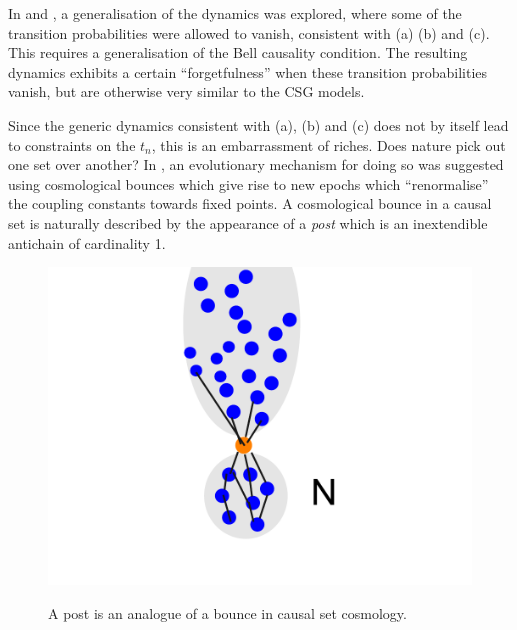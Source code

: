In \cite{rv} and \cite{observablesds},
a generalisation of the dynamics was explored,  where some of the transition probabilities were allowed to vanish, consistent with
(a) (b) and (c). This requires  a  generalisation of the Bell causality condition. The resulting dynamics exhibits a
certain ``forgetfulness'' when these transition probabilities vanish, but are otherwise very similar to the CSG
models.

Since the generic dynamics  consistent with  (a), (b) and (c) does not by itself lead to constraints on the 
 $t_n$,  this is an embarrassment of riches. Does nature pick out one set over another? 
In \cite{csgrg}, an evolutionary mechanism for doing so was suggested using cosmological bounces  which
give rise to new epochs which ``renormalise'' the coupling constants towards fixed points.  
A cosmological bounce in a causal set is naturally described by the appearance of a \emph{post} 
which is an inextendible antichain of cardinality 1.

\begin{figure}[ht]
  \centering \resizebox{3in}{!} {\includegraphics[width=\textwidth]{Post}} 
  \caption{A post is an analogue of a bounce in causal set cosmology.}
\label{post.fig}
\end{figure}

